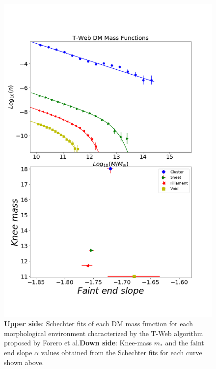 \documentclass[a4paper,fleqn,usenatbib]{mnras}
\begin{document}
\begin{figure}
	\includegraphics[width=\columnwidth]{./pics/T-Web_DM.png}
    \caption{\textbf{Upper side}: Schechter fits of each DM mass function for each morphological environment characterized by the T-Web algorithm proposed by Forero et al.\textbf{Down side}: Knee-mass $m_\ast$ and the faint end slope $\alpha$ values obtained from the Schechter fits for each curve shown above.}
    \label{fig:TwebDM}
\end{figure}
\end{document}
